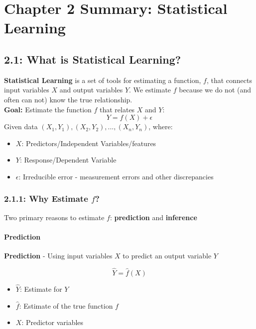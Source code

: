 

\section*{Chapter 2 Summary: Statistical Learning}\label{chapter-2-summary-statistical-learning}

\subsection*{2.1: What is Statistical Learning?}\label{what-is-statistical-learning}

\textbf{Statistical Learning} is a set of tools for estimating a function, \(f\), that connects input variables 
\(X\) and output variables \(Y\). We estimate \(f\) because we do not (and often can not)
know the true relationship. \\

\noindent \textbf{Goal:} Estimate the function \(f\) that relates \(X\) and \(Y\):
\begin{equation*}\tag{2.1}
    Y = f(X) + \epsilon
\end{equation*}
    Given data \((X_1, Y_1), (X_2, Y_2), ..., (X_n, Y_n)\), where:
\begin{itemize}
    \tightlist
    \item \(X\): Predictors/Independent Variables/features
    \item \(Y\): Response/Dependent Variable
    \item  \(\epsilon\): Irreducible error - measurement errors and other discrepancies
\end{itemize}

\subsubsection*{\texorpdfstring{2.1.1: Why Estimate \(f\)?}{2.1.1: Why Estimate f?}}\label{why-estimate-f}


Two primary reasons to estimate \(f\): \textbf{prediction} and \textbf{inference}
\paragraph{Prediction\\}
\textbf{Prediction} - Using input variables \(X\) to predict an output variable \(Y\)

\begin{equation*}\tag{2.2}
    \hat Y = \hat f (X)
\end{equation*}
\begin{itemize}
\tightlist
\item \(\hat Y\): Estimate for \(Y\)
\item \(\hat f\): Estimate of the true function \(f\) 
\item \(X\): Predictor variables
\end{itemize}

